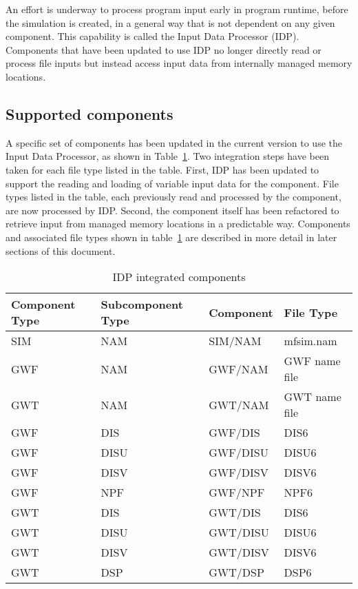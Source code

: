 An effort is underway to process program input early in program runtime, before the simulation is created, in a general way that is not dependent on any given component.  This capability is called the \mf Input Data Processor (IDP).  Components that have been updated to use IDP no longer directly read or process file inputs but instead access input data from internally managed memory locations. 

\subsection{Supported components}

A specific set of \mf components has been updated in the current version to use the Input Data Processor, as shown in Table~\ref{table:idmsupported}.  Two integration steps have been taken for each file type listed in the table.  First, IDP has been updated to support the reading and loading of variable input data for the component.  File types listed in the table, each previously read and processed by the component, are now processed by IDP.  Second, the component itself has been refactored to retrieve input from managed memory locations in a predictable way.  Components and associated file types shown in table~\ref{table:idmsupported} are described in more detail in later sections of this document.

\begin{table}[H]
\caption{IDP integrated components}
\small
\begin{center}
\begin{tabular*}{\columnwidth}{l l l l}
\hline
\hline
\textbf{Component Type} & \textbf{Subcomponent Type} & \textbf{Component} & \textbf{File Type} \\
\hline
SIM & NAM & SIM/NAM & mfsim.nam \\
GWF & NAM & GWF/NAM & GWF name file \\
GWT & NAM & GWT/NAM & GWT name file \\
GWF & DIS & GWF/DIS & DIS6 \\
GWF & DISU & GWF/DISU & DISU6 \\
GWF & DISV & GWF/DISV & DISV6 \\
GWF & NPF & GWF/NPF & NPF6 \\
GWT & DIS & GWT/DIS & DIS6 \\
GWT & DISU & GWT/DISU & DISU6 \\
GWT & DISV & GWT/DISV & DISV6 \\
GWT & DSP & GWT/DSP & DSP6 \\
\hline
\end{tabular*}
\label{table:idmsupported}
\end{center}
\normalsize
\end{table}

